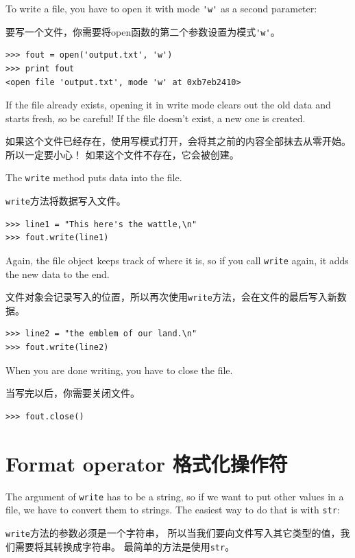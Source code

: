 \documentclass[10pt]{book}
\begin{document}
\begin{CJK}{UTF8}{gbsn}
To write a file, you have to open it with mode \verb"'w'" as a second
parameter:

要写一个文件，你需要将open函数的第二个参数设置为模式\verb"'w'"。

\begin{verbatim}
>>> fout = open('output.txt', 'w')
>>> print fout
<open file 'output.txt', mode 'w' at 0xb7eb2410>
\end{verbatim}
%
If the file already exists, opening it in write mode clears out
the old data and starts fresh, so be careful!
If the file doesn't exist, a new one is created.

如果这个文件已经存在，使用写模式打开，会将其之前的内容全部抹去从零开始。
所以一定要小心！
如果这个文件不存在，它会被创建。

The {\tt write} method puts data into the file.

{\tt write}方法将数据写入文件。

\begin{verbatim}
>>> line1 = "This here's the wattle,\n"
>>> fout.write(line1)
\end{verbatim}
%
Again, the file object keeps track of where it is, so if
you call {\tt write} again, it adds the new data to the end.

文件对象会记录写入的位置，所以再次使用{\tt write}方法，会在文件的最后写入新数据。

\begin{verbatim}
>>> line2 = "the emblem of our land.\n"
>>> fout.write(line2)
\end{verbatim}
%
When you are done writing, you have to close the file.

当写完以后，你需要关闭文件。

\begin{verbatim}
>>> fout.close()
\end{verbatim}
%


\section{Format operator 格式化操作符}

The argument of {\tt write} has to be a string, so if we want
to put other values in a file, we have to convert them to
strings.  The easiest way to do that is with {\tt str}:

{\tt write}方法的参数必须是一个字符串，
所以当我们要向文件写入其它类型的值，我们需要将其转换成字符串。
最简单的方法是使用{\tt str}。


\end{CJK}
\end{document}

